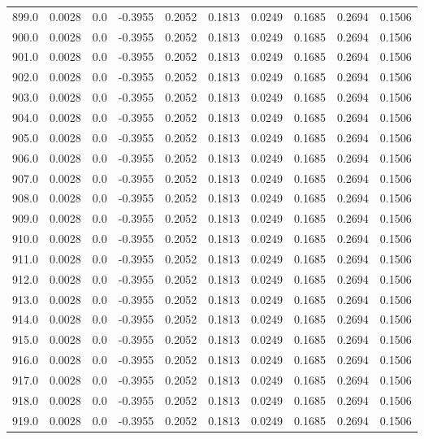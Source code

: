 \begin{longtable}{lrrrrrrrrr}
899.0 & 0.0028 & 0.0 & -0.3955 & 0.2052 & 0.1813 & 0.0249 & 0.1685 & 0.2694 & 0.1506 \\
900.0 & 0.0028 & 0.0 & -0.3955 & 0.2052 & 0.1813 & 0.0249 & 0.1685 & 0.2694 & 0.1506 \\
901.0 & 0.0028 & 0.0 & -0.3955 & 0.2052 & 0.1813 & 0.0249 & 0.1685 & 0.2694 & 0.1506 \\
902.0 & 0.0028 & 0.0 & -0.3955 & 0.2052 & 0.1813 & 0.0249 & 0.1685 & 0.2694 & 0.1506 \\
903.0 & 0.0028 & 0.0 & -0.3955 & 0.2052 & 0.1813 & 0.0249 & 0.1685 & 0.2694 & 0.1506 \\
904.0 & 0.0028 & 0.0 & -0.3955 & 0.2052 & 0.1813 & 0.0249 & 0.1685 & 0.2694 & 0.1506 \\
905.0 & 0.0028 & 0.0 & -0.3955 & 0.2052 & 0.1813 & 0.0249 & 0.1685 & 0.2694 & 0.1506 \\
906.0 & 0.0028 & 0.0 & -0.3955 & 0.2052 & 0.1813 & 0.0249 & 0.1685 & 0.2694 & 0.1506 \\
907.0 & 0.0028 & 0.0 & -0.3955 & 0.2052 & 0.1813 & 0.0249 & 0.1685 & 0.2694 & 0.1506 \\
908.0 & 0.0028 & 0.0 & -0.3955 & 0.2052 & 0.1813 & 0.0249 & 0.1685 & 0.2694 & 0.1506 \\
909.0 & 0.0028 & 0.0 & -0.3955 & 0.2052 & 0.1813 & 0.0249 & 0.1685 & 0.2694 & 0.1506 \\
910.0 & 0.0028 & 0.0 & -0.3955 & 0.2052 & 0.1813 & 0.0249 & 0.1685 & 0.2694 & 0.1506 \\
911.0 & 0.0028 & 0.0 & -0.3955 & 0.2052 & 0.1813 & 0.0249 & 0.1685 & 0.2694 & 0.1506 \\
912.0 & 0.0028 & 0.0 & -0.3955 & 0.2052 & 0.1813 & 0.0249 & 0.1685 & 0.2694 & 0.1506 \\
913.0 & 0.0028 & 0.0 & -0.3955 & 0.2052 & 0.1813 & 0.0249 & 0.1685 & 0.2694 & 0.1506 \\
914.0 & 0.0028 & 0.0 & -0.3955 & 0.2052 & 0.1813 & 0.0249 & 0.1685 & 0.2694 & 0.1506 \\
915.0 & 0.0028 & 0.0 & -0.3955 & 0.2052 & 0.1813 & 0.0249 & 0.1685 & 0.2694 & 0.1506 \\
916.0 & 0.0028 & 0.0 & -0.3955 & 0.2052 & 0.1813 & 0.0249 & 0.1685 & 0.2694 & 0.1506 \\
917.0 & 0.0028 & 0.0 & -0.3955 & 0.2052 & 0.1813 & 0.0249 & 0.1685 & 0.2694 & 0.1506 \\
918.0 & 0.0028 & 0.0 & -0.3955 & 0.2052 & 0.1813 & 0.0249 & 0.1685 & 0.2694 & 0.1506 \\
919.0 & 0.0028 & 0.0 & -0.3955 & 0.2052 & 0.1813 & 0.0249 & 0.1685 & 0.2694 & 0.1506 \\

\end{longtable}
